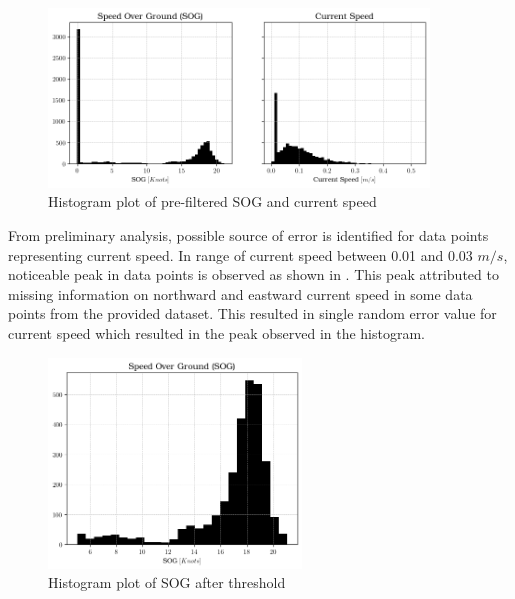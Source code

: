 \begin{figure}[h]
    \centering
        \includegraphics[width=0.9\textwidth]{02_figures/sog_curspeed_anomalies.png}
        \caption{Histogram plot of pre-filtered SOG and current speed}
        \label{fig:anomalies_sog_curspeed}
\end{figure}

From preliminary analysis, possible source of error is identified for data points representing current speed. In range of current speed between 0.01 and 0.03 $m/s$, noticeable peak in data points is observed as shown in . This peak attributed to missing information on northward and eastward current speed in some data points from the provided dataset. This resulted in single random error value for current speed which resulted in the peak observed in the histogram.\\ 

\begin{figure}[h]
    \centering
        \includegraphics[width=0.6\textwidth]{02_figures/hist_init_sog_postfilter.png}
        \caption{Histogram plot of SOG after threshold}
        \label{fig:SOG_greater_five}
\end{figure}

